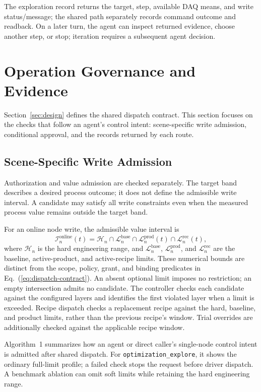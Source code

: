 \documentclass[journal]{IEEEtran}
\begin{document}
The exploration record returns the target, step, available DAQ means, and write status/message; the shared path separately records command outcome and readback. On a later turn, the agent can inspect returned evidence, choose another step, or stop; iteration requires a subsequent agent decision.


 \section{Operation Governance and Evidence}
\label{sec:modules}
Section~\ref{sec:design} defines the shared dispatch contract. This section
focuses on the checks that follow an agent's control intent: scene-specific write admission,
conditional approval, and the records returned by each route.

\subsection{Scene-Specific Write Admission}
\label{sec:governed}
Authorization and value admission are checked separately. The target band describes a desired
process outcome; it does not define the admissible write interval. A candidate may
satisfy all write constraints even when the measured process value remains outside
the target band.

For an online node write, the admissible value interval is
\begin{equation}
\mathcal{I}^{\mathrm{online}}_n(t)=
\mathcal{H}_n\cap\mathcal{L}^{\mathrm{base}}_n\cap\mathcal{L}^{\mathrm{prod}}_n(t)\cap\mathcal{L}^{\mathrm{rec}}_n(t),
\label{eq:admission}
\end{equation}
where $\mathcal{H}_n$ is the hard engineering range, and
$\mathcal{L}^{\mathrm{base}}_n$, $\mathcal{L}^{\mathrm{prod}}_n$, and
$\mathcal{L}^{\mathrm{rec}}_n$ are the baseline, active-product, and
active-recipe limits. These numerical bounds are distinct from the scope,
policy, grant, and binding predicates in Eq.~(\ref{eq:dispatch-contract}).
An absent optional limit imposes no restriction; an empty intersection admits no
candidate. The controller checks each candidate against the configured layers
and identifies the first violated layer when a limit is exceeded. Recipe dispatch
checks a replacement recipe against the hard, baseline, and product limits,
rather than the previous recipe's window. Trial overrides are additionally checked against
the applicable recipe window.

Algorithm~1 summarizes how an agent or direct caller's single-node control intent is admitted after shared dispatch. For
\texttt{optimization\_explore}, it shows the ordinary full-limit profile; a failed
check stops the request before driver dispatch. A benchmark ablation can
omit soft limits while retaining the hard engineering range.
\end{document}

